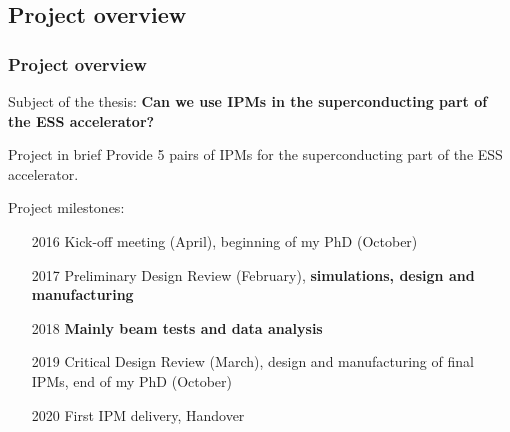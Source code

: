 \subsection{Project overview}
\begin{frame}
  \frametitle{Project overview}
  \begin{alertblock}{Subject of the thesis:}
    \textbf{Can we use IPMs in the superconducting part of the ESS accelerator?}
  \end{alertblock}
  \begin{block}{Project in brief}
    Provide 5 pairs of IPMs for the superconducting part of the ESS accelerator.

    Project milestones:
    \begin{itemize}
      \item[2016] Kick-off meeting (April), beginning of my PhD (October)
      \item[2017] Preliminary Design Review (February), \textbf{simulations, design and manufacturing}
      \item[2018] \textbf{Mainly beam tests and data analysis}
      \item[2019] Critical Design Review (March), design and manufacturing of final IPMs, end of my PhD (October)
      \item[2020] First IPM delivery, Handover
    \end{itemize}
  \end{block}
\end{frame}